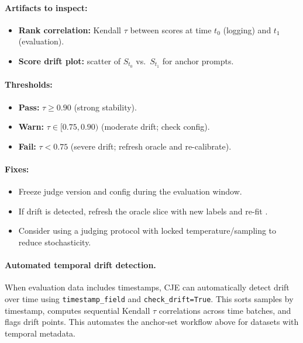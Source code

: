 \paragraph{Artifacts to inspect:}
\begin{itemize}
\item \textbf{Rank correlation:} Kendall $\tau$ between scores at time $t_0$ (logging) and $t_1$ (evaluation).
\item \textbf{Score drift plot:} scatter of $S_{t_0}$ vs.\ $S_{t_1}$ for anchor prompts.
\end{itemize}

\paragraph{Thresholds:}
\begin{itemize}
\item \textbf{Pass:} $\tau \ge 0.90$ (strong stability).
\item \textbf{Warn:} $\tau \in [0.75, 0.90)$ (moderate drift; check config).
\item \textbf{Fail:} $\tau < 0.75$ (severe drift; refresh oracle and re-calibrate).
\end{itemize}

\paragraph{Fixes:}
\begin{itemize}
\item Freeze judge version and config during the evaluation window.
\item If drift is detected, refresh the oracle slice with new labels and re-fit \autocal.
\item Consider using a judging protocol with locked temperature/sampling to reduce stochasticity.
\end{itemize}

\paragraph{Automated temporal drift detection.} When evaluation data includes timestamps, CJE can automatically detect drift over time using \texttt{timestamp\_field} and \texttt{check\_drift=True}. This sorts samples by timestamp, computes sequential Kendall $\tau$ correlations across time batches, and flags drift points. This automates the anchor-set workflow above for datasets with temporal metadata.

